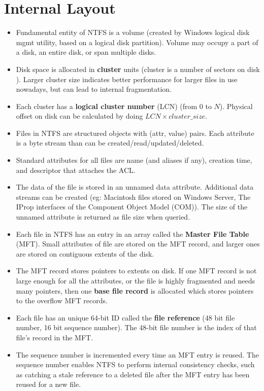 \documentclass{article}
\theoremstyle{plain}
\theoremstyle{definition}
\begin{document}
\section{Internal Layout}
\begin{itemize}
    \item Fundamental entity of NTFS is a volume (created by Windows logical disk mgmt utility, based on a logical disk partition). Volume may occupy a part of a disk, an entire disk, or span multiple disks. 
    
    \item Disk space is allocated in \textbf{cluster} units (cluster is a number of sectors on disk ). Larger cluster size indicates better performance for larger files in use nowadays, but can lead to internal fragmentation. 
    
    \item Each cluster has a \textbf{logical cluster number} (LCN) (from $0$ to $N$). Physical offset on disk can be calculated by doing $LCN \times cluster\_size$. 
    
    \item Files in NTFS are structured objects with (attr, value) pairs. Each attribute is a byte stream than can be created/read/updated/deleted. 
    
    \item Standard attributes for all files are name (and aliases if any), creation time, and descriptor that attaches the ACL. 
    
    \item The data of the file is stored in an unnamed data attribute. Additional data streams can be created (eg: Macintosh files stored on Windows Server, The IProp interfaces of the Component Object Model (COM)). The size of the unnamed attribute is returned as file size when queried.
    
    \item Each file in NTFS has an entry in an array called the \textbf{Master File Table} (MFT). Small attributes of file are stored on the MFT record, and larger ones are stored on contiguous extents of the disk. 
    
    \item The MFT record stores pointers to extents on disk. If one MFT record is not large enough for all the attributes, or the file is highly fragmented and needs many pointers, then one \textbf{base file record} is allocated which stores pointers to the overflow MFT records. 
    
    \item Each file has an unique 64-bit ID called the \textbf{file reference} (48 bit file number, 16 bit sequence number). The 48-bit file number is the index of that file's record in the MFT.
    
    \item The sequence number is incremented every time an MFT entry is reused. The sequence number enables NTFS to perform internal consistency checks, such as catching a stale reference to a deleted file after the MFT entry has been reused for a new file.
\end{itemize}
\end{document}
